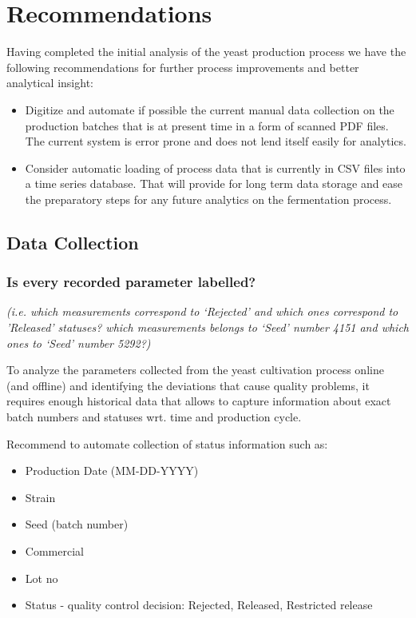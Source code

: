 \section{Recommendations}
Having completed the initial analysis of the yeast production process we have the following recommendations for further process improvements and better analytical insight:

\begin{itemize}
\item Digitize and automate if possible the current manual data collection on the production batches that is at present time in a form of scanned PDF files. The current system is error prone and does not lend itself easily for analytics.
\item Consider automatic loading of process data that is currently in CSV files into a time series database. That will provide for long term data storage and ease the preparatory steps for any future analytics on the fermentation process.
\end{itemize}

\subsection{Data Collection}
\subsubsection{Is every recorded parameter labelled? }

\emph{(i.e. which measurements correspond to ‘Rejected’ and which ones correspond to ’Released’ statuses?  which measurements belongs to ‘Seed’ number 4151 and which ones to ‘Seed’ number 5292?)}

To analyze the parameters collected from the yeast cultivation process online (and offline) and identifying the deviations that cause quality problems, it requires enough historical data that allows to capture information about exact batch numbers and statuses wrt. time and production cycle. 

Recommend to automate collection of status information such as:
\begin{itemize}
    \item Production Date (MM-DD-YYYY)
    \item Strain
    \item Seed (batch number)
    \item Commercial
    \item Lot no
    \item Status - quality control decision: Rejected, Released, Restricted release
\end{itemize}

